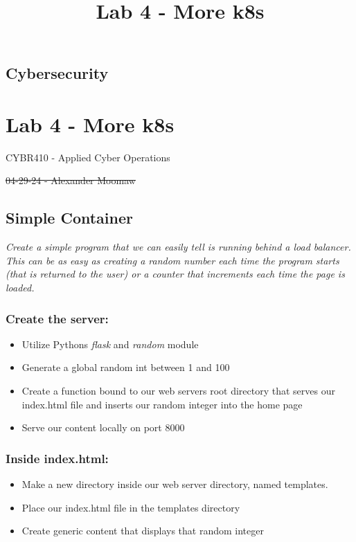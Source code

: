 \documentclass[
]{article}
\title{Lab 4 - More k8s}
\author{}
\date{}
\providecommand{\tightlist}{%
  \setlength{\itemsep}{0pt}\setlength{\parskip}{0pt}}
\begin{document}
\maketitle

\subsection{Cybersecurity}\label{cybersecurity}

\section{Lab 4 - More k8s}\label{lab-4---more-k8s}

CYBR410 - Applied Cyber Operations

\st{04-29-24 - Alexander Moomaw}

\subsection{Simple Container}\label{simple-container}

\emph{Create a simple program that we can easily tell is running behind
a load balancer. This can be as easy as creating a random number each
time the program starts (that is returned to the user) or a counter that
increments each time the page is loaded.}

\subsubsection{Create the server:}\label{create-the-server}

\begin{itemize}
\tightlist
\item
  Utilize Pythons\textquotesingle{} \emph{flask} and \emph{random}
  module
\item
  Generate a global random int between 1 and 100
\item
  Create a function bound to our web servers root directory that serves
  our index.html file and inserts our random integer into the home page
\item
  Serve our content locally on port 8000
\end{itemize}

\subsubsection{Inside index.html:}\label{inside-index.html}

\begin{itemize}
\tightlist
\item
  Make a new directory inside our web server directory, named templates.
\item
  Place our index.html file in the templates directory
\item
  Create generic content that displays that random integer
\end{itemize}
\end{document}
